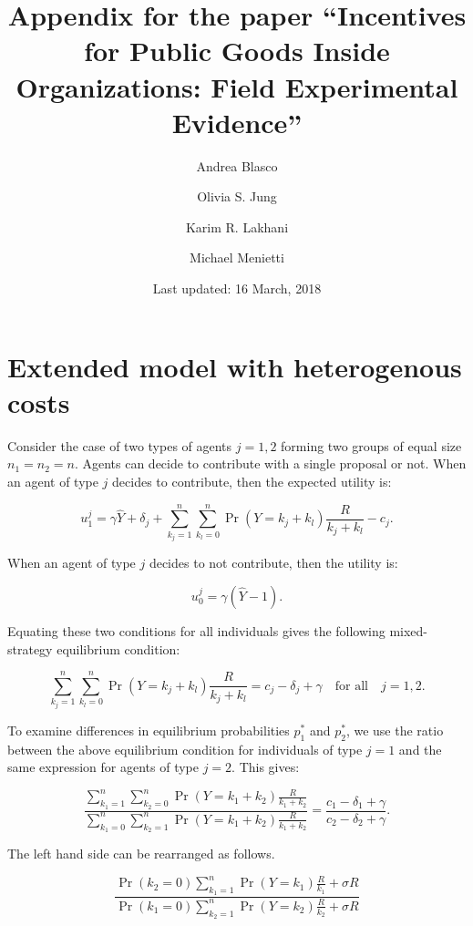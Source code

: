 \documentclass[11pt, titlepage]{article}
\title{Appendix for the paper ``Incentives for Public Goods Inside
Organizations: Field Experimental Evidence''}
\author{Andrea Blasco \and Olivia S. Jung \and Karim R. Lakhani \and Michael Menietti}
\date{Last updated: 16 March, 2018}
\begin{document}
\maketitle


\clearpage
\tableofcontents
\setcounter{tocdepth}{2}
\clearpage

\section{Extended model with heterogenous
costs}\label{extended-model-with-heterogenous-costs}

Consider the case of two types of agents \(j=1,2\) forming two groups of
equal size \(n_1=n_2=n\). Agents can decide to contribute with a single
proposal or not. When an agent of type \(j\) decides to contribute, then
the expected utility is:

\begin{equation}
  u_1^j = \gamma\hat Y + \delta_j + \sum_{k_j=1}^n \sum_{k_l=0}^n \Pr(Y=k_j+k_l) \frac{R}{k_j+k_l} - c_j.
\end{equation}

When an agent of type \(j\) decides to not contribute, then the utility
is:

\begin{equation}
 u_0^j = \gamma (\hat Y - 1).
\end{equation}

Equating these two conditions for all individuals gives the following
mixed-strategy equilibrium condition:

\begin{equation}
\sum_{k_j=1}^n \sum_{k_l=0}^n \Pr(Y=k_j+k_l) \frac{R}{k_j+k_l} 
  = c_j -\delta_j + \gamma \quad\text{for all}\quad j=1,2.
\end{equation}

To examine differences in equilibrium probabilities \(p_1^*\) and
\(p_2^*\), we use the ratio between the above equilibrium condition for
individuals of type \(j=1\) and the same expression for agents of type
\(j=2\). This gives:

\begin{equation}
\frac{\sum_{k_1=1}^n \sum_{k_2=0}^n \Pr(Y=k_1+k_2) \frac{R}{k_1+k_2}}{\sum_{k_1=0}^n \sum_{k_2=1}^n \Pr(Y=k_1+k_2) \frac{R}{k_1+k_2}} = \frac{c_1 -\delta_1 + \gamma}{c_2 -\delta_2 + \gamma}.
\end{equation}

The left hand side can be rearranged as follows.

\begin{equation}
\frac{\Pr(k_2=0) \sum_{k_1=1}^n\Pr(Y=k_1)\frac{R}{k_1} +  \sigma R}{\Pr(k_1=0) \sum_{k_2=1}^n\Pr(Y=k_2)\frac{R}{k_2} +  \sigma R} 
\end{equation}
\end{document}
